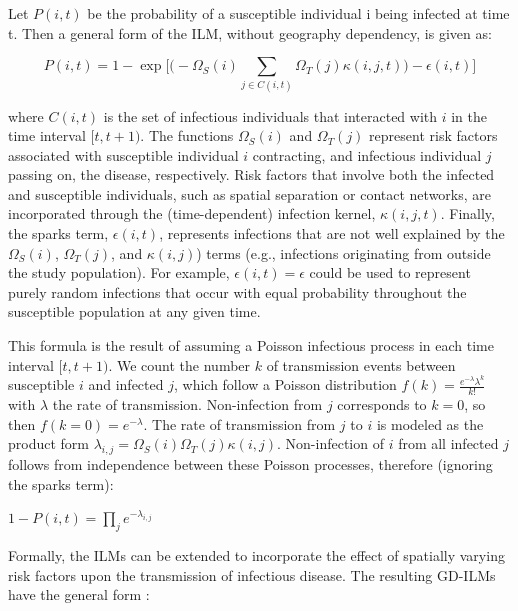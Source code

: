\documentclass{article}
\begin{document}
Let $P(i, t)$ be the probability of a susceptible individual i being infected at time t. Then a general form of the ILM, without geography dependency, is given as:

\begin{equation}
P(i, t)=1-\exp\big[ \big( -\Omega_{S}(i) \sum\limits_{j \in C(i, t)} \Omega_{T}(j) \kappa(i, j, t)\big) - \epsilon(i, t)\big]
\end{equation}

where $C(i, t)$ is the set of infectious individuals that interacted with $i$ in the time interval $[t, t + 1)$. The functions $\Omega_{S}(i)$ and $\Omega_{T}(j)$ represent risk factors associated with susceptible individual $i$ contracting, and infectious individual $j$ passing on, the disease, respectively. Risk factors that involve both the infected and susceptible individuals, such as spatial separation or contact networks, are incorporated through the (time-dependent) infection kernel, $\kappa(i, j, t)$. Finally, the sparks term, $\epsilon(i, t)$, represents infections that are not well explained by the $\Omega_{S}(i)$, $\Omega_{T}(j)$, and $\kappa(i, j)$) terms (e.g., infections originating from outside the study population). For example, $\epsilon(i, t)=\epsilon$ could be used to represent purely random infections that occur with equal probability throughout the susceptible population at any given time.

This formula is the result of assuming a Poisson infectious process in each time interval $[t, t + 1)$. We count the number $k$ of transmission events between susceptible $i$ and infected $j$, which follow a Poisson distribution $f\left( k \right) = \frac{{e^{ - \lambda } \lambda ^k }}{{k!}}$ with $\lambda$ the rate of transmission. Non-infection from $j$ corresponds to $k=0$, so then $f(k=0)=e^{ - \lambda }$. The rate of transmission from $j$ to $i$ is modeled as the product form  $\lambda_{i,j}=\Omega_{S}(i)\Omega_{T}(j) \kappa(i, j)$. Non-infection of $i$ from all infected $j$ follows from independence between these Poisson processes, therefore (ignoring the sparks term):

\begin{center}
$1-P(i, t)= \prod\limits_{j}e^{ - \lambda_{i,j} }$
\end{center}

Formally, the ILMs can be extended to incorporate the effect of spatially varying risk factors upon the transmission of infectious disease. The resulting GD-ILMs have the general form \cite{Mahsin2020}:
\end{document}
